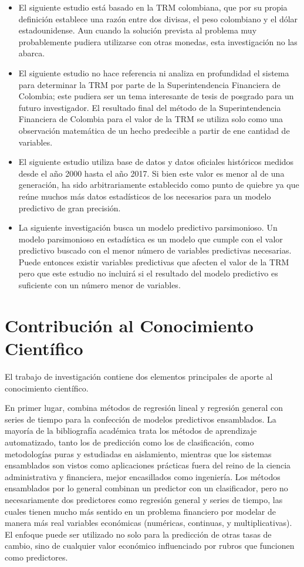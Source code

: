 \begin{itemize}
	\item El siguiente estudio está basado en la TRM colombiana, que por su propia definición establece una razón entre dos divisas, el peso colombiano y el dólar estadounidense. Aun cuando la solución prevista al problema muy probablemente pudiera utilizarse con otras monedas, esta investigación no las abarca.
	\item El siguiente estudio no hace referencia ni analiza en profundidad el sistema para determinar la TRM por parte de la Superintendencia Financiera de Colombia; este pudiera ser un tema interesante de tesis de posgrado para un futuro investigador. El resultado final del método de la Superintendencia Financiera de Colombia para el valor de la TRM se utiliza solo como una observación matemática de un hecho predecible a partir de ene cantidad de variables.
	\item El siguiente estudio utiliza base de datos y datos oficiales históricos medidos desde el año 2000 hasta el año 2017. Si bien este valor es menor al de una generación, ha sido arbitrariamente establecido como punto de quiebre ya que reúne muchos más datos estadísticos de los necesarios para un modelo predictivo de gran precisión.
	\item La siguiente investigación busca un modelo predictivo parsimonioso. Un modelo parsimonioso en estadística es un modelo que cumple con el valor predictivo buscado con el menor número de variables predictivas necesarias. Puede entonces existir variables predictivas que afecten el valor de la TRM pero que este estudio no incluirá si el resultado del modelo predictivo es suficiente con un número menor de variables.
\end{itemize}

\section{Contribución al Conocimiento Científico}
El trabajo de investigación contiene dos elementos principales de aporte al conocimiento científico.

En primer lugar, combina métodos de regresión lineal y regresión general con series de tiempo para la confección de modelos predictivos ensamblados. La mayoría de la bibliografía académica trata los métodos de aprendizaje automatizado, tanto los de predicción como los de clasificación, como metodologías puras y estudiadas en aislamiento, mientras que los sistemas ensamblados son vistos como aplicaciones prácticas fuera del reino de la ciencia administrativa y financiera, mejor encasillados como ingeniería. Los métodos ensamblados por lo general combinan un predictor con un clasificador, pero no necesariamente dos predictores como regresión general y series de tiempo, las cuales tienen mucho más sentido en un problema financiero por modelar de manera más real variables económicas (numéricas, continuas, y multiplicativas). El enfoque puede ser utilizado no solo para la predicción de otras tasas de cambio, sino de cualquier valor económico influenciado por rubros que funcionen como predictores.

